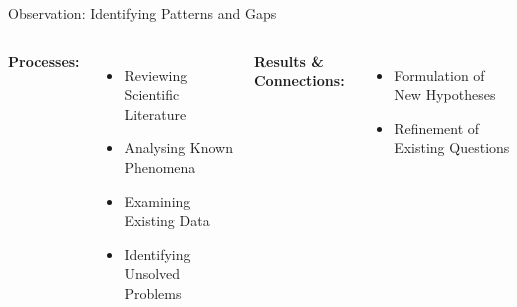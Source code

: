 \begin{frame}{Observation: Identifying Patterns and Gaps}
  \begin{columns}
    \textbf{Processes:}
    \begin{itemize}
      \item Reviewing Scientific Literature
      \item Analysing Known Phenomena
      \item Examining Existing Data
      \item Identifying Unsolved Problems
    \end{itemize}

    \textbf{Results \& Connections:}
    \begin{itemize}
      \item Formulation of New Hypotheses
      \item Refinement of Existing Questions
      \vspace{1.81cm}
    \end{itemize}
  \end{columns}
\end{frame}

